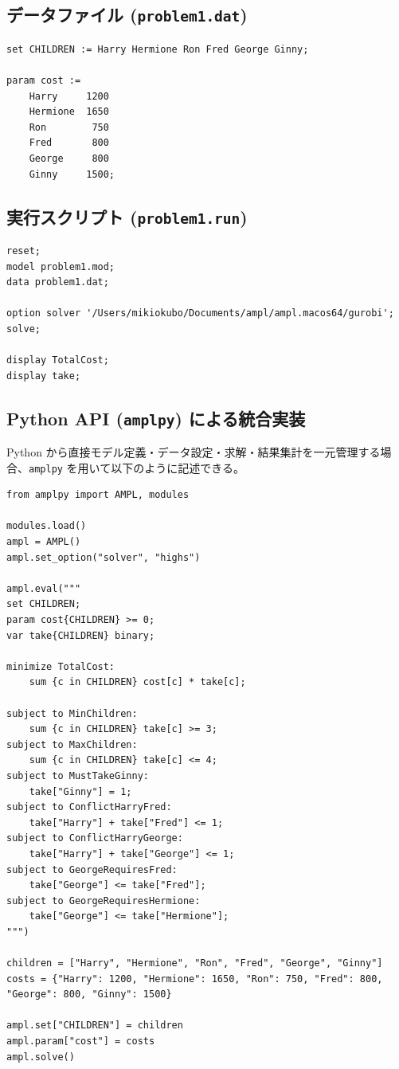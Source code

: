 \documentclass[11pt,a4paper]{ltjsarticle}
\begin{document}
\subsection{データファイル (\texttt{problem1.dat})}
\begin{lstlisting}
set CHILDREN := Harry Hermione Ron Fred George Ginny;

param cost :=
    Harry     1200
    Hermione  1650
    Ron        750
    Fred       800
    George     800
    Ginny     1500;
\end{lstlisting}

\subsection{実行スクリプト (\texttt{problem1.run})}
\begin{lstlisting}
reset;
model problem1.mod;
data problem1.dat;

option solver '/Users/mikiokubo/Documents/ampl/ampl.macos64/gurobi';
solve;

display TotalCost;
display take;
\end{lstlisting}

\subsection{Python API (\texttt{amplpy}) による統合実装}
Python から直接モデル定義・データ設定・求解・結果集計を一元管理する場合、\texttt{amplpy} を用いて以下のように記述できる。

\begin{lstlisting}
from amplpy import AMPL, modules

modules.load()
ampl = AMPL()
ampl.set_option("solver", "highs")

ampl.eval("""
set CHILDREN;
param cost{CHILDREN} >= 0;
var take{CHILDREN} binary;

minimize TotalCost:
    sum {c in CHILDREN} cost[c] * take[c];

subject to MinChildren:
    sum {c in CHILDREN} take[c] >= 3;
subject to MaxChildren:
    sum {c in CHILDREN} take[c] <= 4;
subject to MustTakeGinny:
    take["Ginny"] = 1;
subject to ConflictHarryFred:
    take["Harry"] + take["Fred"] <= 1;
subject to ConflictHarryGeorge:
    take["Harry"] + take["George"] <= 1;
subject to GeorgeRequiresFred:
    take["George"] <= take["Fred"];
subject to GeorgeRequiresHermione:
    take["George"] <= take["Hermione"];
""")

children = ["Harry", "Hermione", "Ron", "Fred", "George", "Ginny"]
costs = {"Harry": 1200, "Hermione": 1650, "Ron": 750, "Fred": 800, "George": 800, "Ginny": 1500}

ampl.set["CHILDREN"] = children
ampl.param["cost"] = costs
ampl.solve()
\end{lstlisting}
\end{document}
